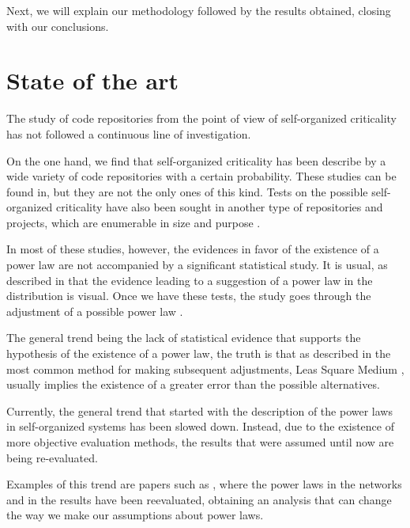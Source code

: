 \documentclass[conference]{IEEEtran}
\begin{document}
Next, we will explain our methodology followed by the results
obtained, closing with our conclusions.



\section{State of the art}\label{soa}

The study of code repositories from the point of view of
self-organized criticality has not followed a continuous line of
investigation.

On the one hand, we find that self-organized criticality has been
describe by a wide variety of code repositories with a certain
probability. These studies can be found
in\cite{wu2007empirical,gorshenev2004punctuated}, but they are not the
only ones of this kind. Tests on the possible self-organized
criticality have also been sought in another type of repositories and
projects, which are enumerable in size and purpose
\cite{Merelo2016:repomining,merelo16:slash,merelo16:self,merelo2017self}.

In most of these studies, however, the evidences in favor of the
existence of a power law are not accompanied by a significant
statistical study. It is usual, as described in \cite{newman2005power}
that the evidence leading to a suggestion of a power law in the
distribution is visual. Once we have these tests, the study goes
through the adjustment of a possible power law
\cite{merelo2017self,arafat2009commit}.

The general trend being the lack of statistical evidence that supports
the hypothesis of the existence of a power law, the truth is that as
described in \cite{newman2005power, clauset2009power} the most common
method for making subsequent adjustments, Leas Square Medium
\cite{merelo2017self,arafat2009commit,merelo16:self}, usually implies
the existence of a greater error than the possible alternatives.

Currently, the general trend that started with the description of the
power laws in self-organized systems has been slowed down. Instead,
due to the existence of more objective evaluation methods, the results
that were assumed until now are being re-evaluated.

Examples of this trend are papers such as \cite{Holme2019,
  Broido2019}, where the power laws in the networks and in the results
have been reevaluated, obtaining an analysis that can change the way
we make our assumptions about power laws.
\end{document}
